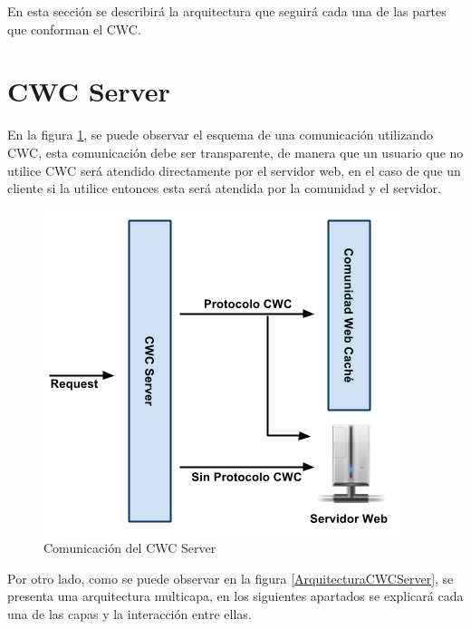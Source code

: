 En esta sección se describirá la arquitectura que seguirá cada una de las partes que conforman el CWC.

\section{CWC Server}

En la figura \ref{ComunicacionCWCServer}, se puede observar el esquema de una comunicación utilizando CWC, esta comunicación debe ser transparente, de manera que un usuario que no utilice CWC será atendido directamente por el servidor web, en el caso de que un cliente si la utilice entonces esta será atendida por la comunidad  y el servidor. 


\begin{figure}[h]
  \centering
    \includegraphics[scale=0.75]{gfx/ComunicacionCWCServer}
  \caption{Comunicación del CWC Server}
  \label{ComunicacionCWCServer}
\end{figure}


Por otro lado, como se puede observar en la figura \ref{ArquitecturaCWCServer}, se presenta una arquitectura multicapa, en los siguientes apartados se explicará cada una de las capas y la interacción entre ellas.


